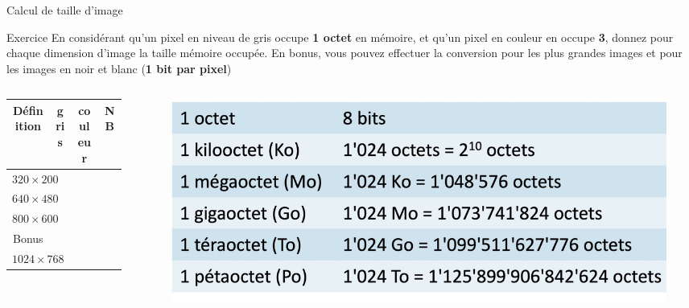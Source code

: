\documentclass{beamer}
\begin{document}
\begin{frame}{Calcul de taille d'image}{}
	\begin{alertblock}{Exercice}
		En considérant qu'un pixel en niveau de gris occupe \textbf{1 octet} en mémoire, et qu'un pixel en couleur en occupe \textbf{3}, donnez pour chaque dimension d'image la taille mémoire occupée. En bonus, vous pouvez effectuer la conversion pour les plus grandes images et pour les images en noir et blanc (\textbf{1 bit par pixel})
	\end{alertblock}

	\begin{columns}
		\begin{column}{0.6\textwidth}
			\begin{table}
				\begin{tabular}{| c | c | c || c |}
					\hline
					Définition       & gris & couleur & NB \\
					\hline \hline
					$320\times 200$  &      &         &    \\
					$640\times 480$  &      &         &    \\
					$800\times 600$  &      &         &    \\
					\hline
					Bonus            &      &         &    \\
					$1024\times 768$ &      &         &    \\
					\hline
				\end{tabular}
			\end{table}
		\end{column}
		\begin{column}{0.4\textwidth}
			\begin{figure}
				\includegraphics[width=1\linewidth]{conversion-octets.jpg}
			\end{figure}
		\end{column}
	\end{columns}
\end{frame}
\end{document}
